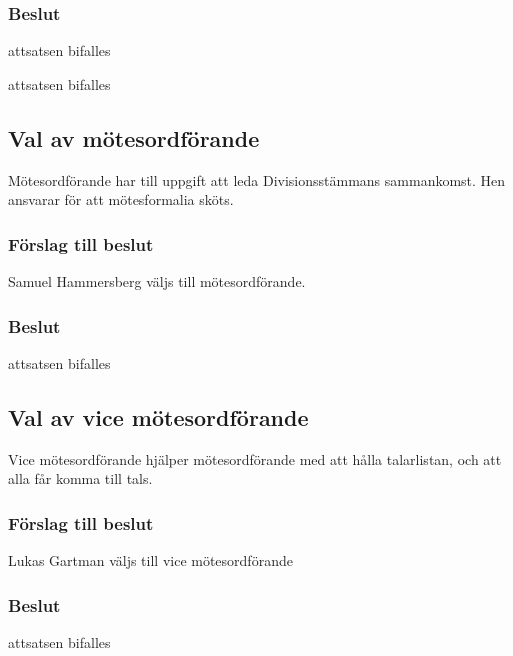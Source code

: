 \documentclass[protokoll]{dvd}
\begin{document}
\subsubsection*{Beslut}

\begin{attsatser}
    \item attsatsen bifalles
	\item attsatsen bifalles
\end{attsatser}

\subsection{Val av mötesordförande}
Mötesordförande har till uppgift att leda Divisionsstämmans sammankomst.
Hen ansvarar för att mötesformalia sköts.
\subsubsection*{Förslag till beslut}
\begin{attsatser}
    \item Samuel Hammersberg väljs till mötesordförande.
\end{attsatser}
\subsubsection*{Beslut}
\begin{attsatser}
    \item attsatsen bifalles
\end{attsatser}

\subsection{Val av vice mötesordförande}
Vice mötesordförande hjälper mötesordförande med att hålla talarlistan, och att alla får komma till tals.
\subsubsection*{Förslag till beslut}
\begin{attsatser}
    \item Lukas Gartman väljs till vice mötesordförande
\end{attsatser}
\subsubsection*{Beslut}
\begin{attsatser}
    \item attsatsen bifalles
\end{attsatser}
\end{document}
